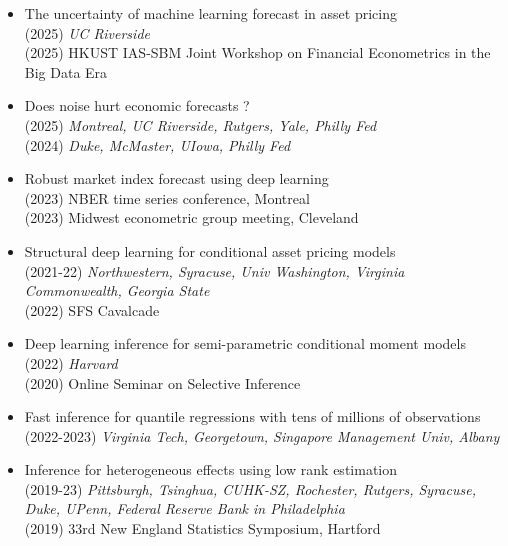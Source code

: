 \documentclass[11pt]{article}
\begin{document}
\begin{itemize}
	
	\item The uncertainty of machine learning forecast in asset pricing
	\hfill\\ 
	(2025) \textit{UC Riverside}\\
	(2025)  HKUST IAS-SBM Joint Workshop on Financial Econometrics in the Big Data Era 

\item Does noise hurt economic forecasts ? 
\hfill\\
(2025) \textit{Montreal, UC Riverside, Rutgers, Yale, Philly Fed}  
\hfill\\
(2024) \textit{Duke, McMaster,  UIowa, Philly Fed}  

\item Robust market index forecast using deep learning
\hfill\\
(2023) NBER time series conference, Montreal\\
(2023) Midwest econometric group meeting, Cleveland 



\item Structural deep learning  for  conditional asset pricing models
\hfill\\
(2021-22) \textit{Northwestern, Syracuse, Univ Washington, Virginia Commonwealth, Georgia State}
\\
 (2022) SFS Cavalcade

\item Deep learning inference for semi-parametric conditional moment models
\hfill\\
(2022) \textit{Harvard } \\
(2020) Online Seminar on Selective Inference

  
  \item Fast inference for quantile regressions with tens of millions of observations
  \hfill\\
  (2022-2023) \textit{Virginia Tech, Georgetown, Singapore Management Univ, Albany}  
  
  
 
 
\item Inference for heterogeneous effects using low rank estimation
\hfill\\
(2019-23) \textit{Pittsburgh, Tsinghua, CUHK-SZ, Rochester,  Rutgers, Syracuse, Duke, UPenn, Federal Reserve Bank in Philadelphia}\\
(2019)  33rd New England Statistics Symposium,  Hartford


\end{itemize}
\end{document}
